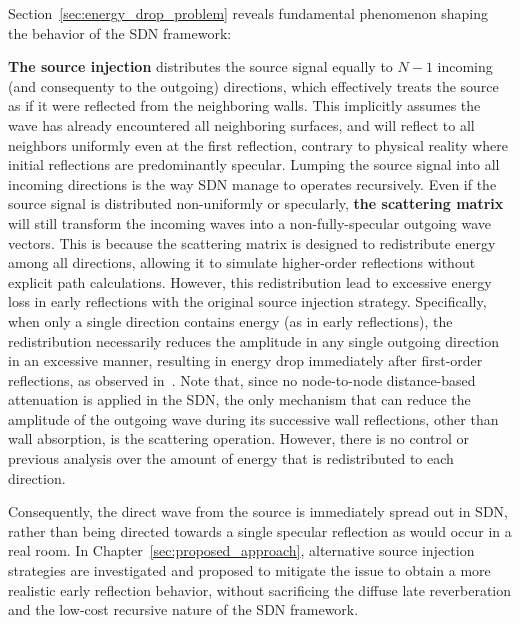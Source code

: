 \documentclass[journal]{IEEEtran}
\begin{document}
Section~\ref{sec:energy_drop_problem} reveals fundamental phenomenon shaping the behavior of the SDN framework:

\textbf{The source injection} distributes the source signal equally to \(N-1\) incoming (and consequenty to the outgoing) directions, which effectively treats the source as if it were reflected from the neighboring walls. This implicitly assumes the wave has
already encountered all neighboring surfaces, and will reflect to all neighbors uniformly even at the first reflection, contrary to physical reality where initial reflections are predominantly specular. Lumping the source signal into all incoming directions is the way SDN manage to operates recursively. 
Even if the source signal is distributed non-uniformly or specularly, \textbf{the scattering matrix} will still transform the incoming waves into a non-fully-specular outgoing wave vectors.
This is because the scattering matrix is designed to redistribute energy among all directions, allowing it to simulate higher-order reflections without explicit path calculations. 
However, this redistribution lead to excessive energy loss in early reflections with the original source injection strategy.
Specifically, when only a single direction contains energy (as in early reflections), 
the redistribution necessarily reduces the amplitude in any single outgoing direction in an excessive manner,
resulting in energy drop immediately after first-order reflections, as observed in~\cite{SDNwaspaa}.
Note that, since no node-to-node distance-based attenuation is applied in the SDN, the only mechanism that can reduce the amplitude of the outgoing wave during its successive wall reflections, other than wall absorption, is the scattering operation.
However, there is no control or previous analysis over the amount of
energy that is redistributed to each direction.
    
Consequently, the direct wave from the source is immediately spread out in SDN, rather than being directed towards a single specular reflection as would occur in a real room. 
In Chapter~\ref{sec:proposed_approach}, alternative source injection strategies are investigated and proposed to mitigate the issue to obtain a more realistic early reflection behavior, without sacrificing the diffuse late reverberation and the low-cost recursive nature of the SDN framework.
\end{document}
